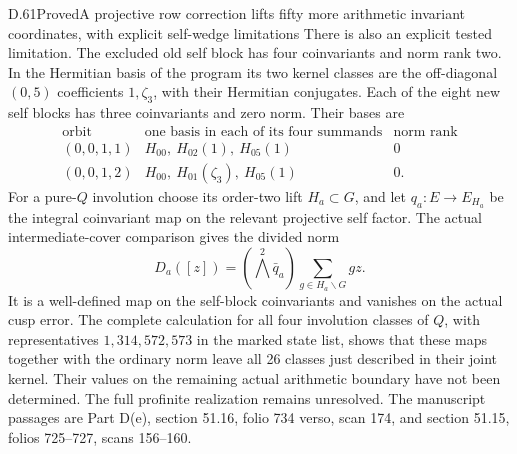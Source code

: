 \begin{statement}{D.61}{Proved}{A projective row correction lifts fifty more arithmetic invariant coordinates, with explicit self-wedge limitations}
There is also an explicit tested limitation.
The excluded old self block has four
coinvariants and norm rank two. In the
Hermitian basis of the program its two
kernel classes are the off-diagonal
\((0,5)\) coefficients \(1,\zeta_3\),
with their Hermitian conjugates. Each of
the eight new self blocks has three
coinvariants and zero norm. Their bases
are
\[
 \begin{array}{c|c|c}
 \text{orbit}&\text{one basis in each of its four summands}
                                      &\text{norm rank}\\\hline
 (0,0,1,1)&H_{00},\ H_{02}(1),\ H_{05}(1)&0\\
 (0,0,1,2)&H_{00},\ H_{01}(\zeta_3),\ H_{05}(1)&0.
 \end{array}
 \tag{D.61.9}
\]
For a pure-\(Q\) involution choose its order-two
lift \(H_a\subset G\), and let
\(q_a:E\to E_{H_a}\) be the integral
coinvariant map on the relevant projective
self factor. The actual intermediate-cover
comparison gives the divided norm
\[
 D_a([z])=
       (\bigwedge^2\bar q_a)
                  \sum_{g\in H_a\backslash G}gz.
 \tag{D.61.10}
\]
It is a well-defined map on the self-block
coinvariants and vanishes on the actual
cusp error. The complete calculation for
all four involution classes of \(Q\),
with representatives \(1,314,572,573\)
in the marked state list, shows that
these maps together with the ordinary
norm leave all 26 classes just described
in their joint kernel. Their values on
the remaining actual arithmetic boundary
have not been determined. The full
profinite realization remains unresolved.
The manuscript passages are Part D(e),
section 51.16, folio 734 verso, scan 174,
and section 51.15, folios 725--727,
scans 156--160.
\end{statement}
